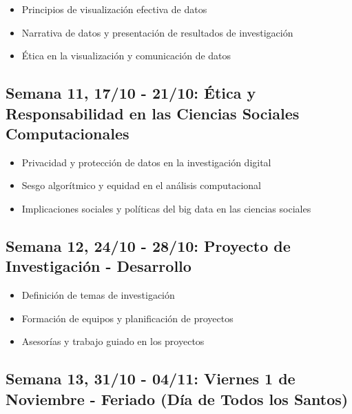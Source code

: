 \documentclass[11pt,letter,]{article}
\providecommand{\tightlist}{%
  \setlength{\itemsep}{0pt}\setlength{\parskip}{0pt}}
\begin{document}
\begin{itemize}
\tightlist
\item
  Principios de visualización efectiva de datos
\item
  Narrativa de datos y presentación de resultados de investigación
\item
  Ética en la visualización y comunicación de datos
\end{itemize}

\hypertarget{semana-11-1710---2110-uxe9tica-y-responsabilidad-en-las-ciencias-sociales-computacionales}{%
\subsection{Semana 11, 17/10 - 21/10: Ética y Responsabilidad en las
Ciencias Sociales
Computacionales}\label{semana-11-1710---2110-uxe9tica-y-responsabilidad-en-las-ciencias-sociales-computacionales}}

\begin{itemize}
\tightlist
\item
  Privacidad y protección de datos en la investigación digital
\item
  Sesgo algorítmico y equidad en el análisis computacional
\item
  Implicaciones sociales y políticas del big data en las ciencias
  sociales
\end{itemize}

\hypertarget{semana-12-2410---2810-proyecto-de-investigaciuxf3n---desarrollo}{%
\subsection{Semana 12, 24/10 - 28/10: Proyecto de Investigación -
Desarrollo}\label{semana-12-2410---2810-proyecto-de-investigaciuxf3n---desarrollo}}

\begin{itemize}
\tightlist
\item
  Definición de temas de investigación
\item
  Formación de equipos y planificación de proyectos
\item
  Asesorías y trabajo guiado en los proyectos
\end{itemize}

\hypertarget{semana-13-3110---0411-viernes-1-de-noviembre---feriado-duxeda-de-todos-los-santos}{%
\subsection{Semana 13, 31/10 - 04/11: Viernes 1 de Noviembre - Feriado
(Día de Todos los
Santos)}\label{semana-13-3110---0411-viernes-1-de-noviembre---feriado-duxeda-de-todos-los-santos}}
\end{document}
